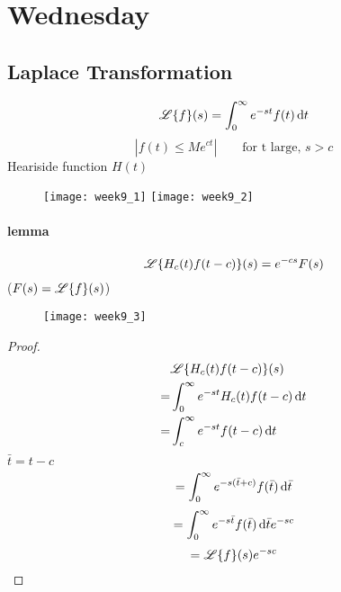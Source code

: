 
\section{Wednesday}
\subsection{Laplace Transformation}
\[\mathscr{L}\{f\}(s)=\int_0^\infty e^{-st}f(t)\,\mathrm{d} t
\]
\[|f(t)\leq Me^{ct}|\qquad\text{for t large, } s>c
\]
Heariside function $H(t)$
\begin{figure}[H]
\centering
\texttt{[image: week9\_1]}
\texttt{[image: week9\_2]}
\end{figure}

\paragraph{lemma}
\[\mathscr{L}\{H_c(t)f(t-c)\}(s)=e^{-cs}F(s)\]
($F(s)=\mathscr{L}\{f\}(s)$)
\begin{figure}[H]
\centering
\texttt{[image: week9\_3]}
\end{figure}
\begin{proof}
\[\begin{aligned}
&\mathscr{L}\{H_c(t)f(t-c)\}(s)\\
=&\int_0^\infty e^{-st}H_c(t)f(t-c)\,\mathrm{d} t\\
=&\int_c^\infty e^{-st}f(t-c)\,\mathrm{d} t
\end{aligned}\]
$\bar{t}=t-c$
\[=\int_0^\infty e^{-s(\bar{t}+c)}f(\bar{t})\,\mathrm{d} \bar{t}
\]
\[=\int_0^\infty e^{-s\bar{t}}f(\bar{t})\,\mathrm{d} \bar{t} e^{-sc}
\]
\[=\mathscr{L}\{f\}(s)e^{-sc}
\]
\end{proof}
